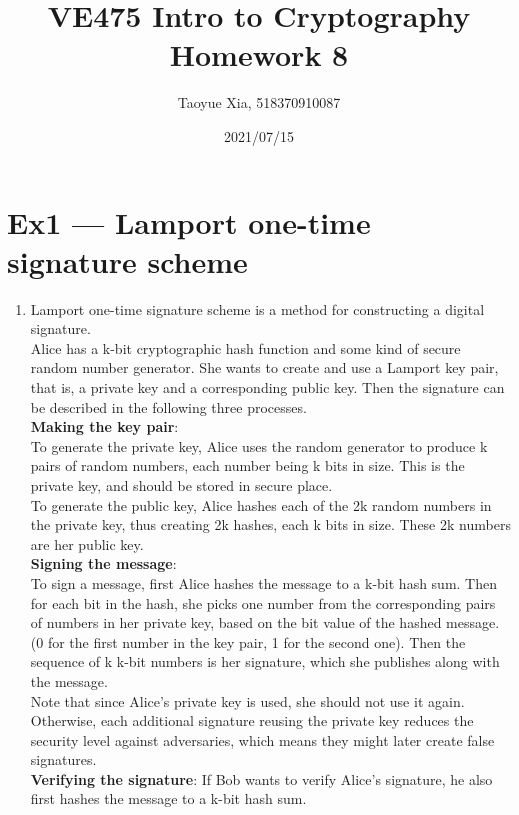 \documentclass[12pt, a4paper]{article}
\begin{document}
\title{VE475 Intro to Cryptography Homework 8}
\author{Taoyue Xia, 518370910087}
\date{2021/07/15}
\maketitle

\section*{Ex1 --- Lamport one-time signature scheme}
\begin{enumerate}
    \item Lamport one-time signature scheme is a method for constructing a digital signature.\\
          Alice has a k-bit cryptographic hash function and some kind of secure random number generator. 
          She wants to create and use a Lamport key pair, that is, a private key and a corresponding public key. 
          Then the signature can be described in the following three processes.\\
          \textbf{Making the key pair}:\\
          To generate the private key, Alice uses the random generator to produce k pairs of random numbers, 
          each number being k bits in size. This is the private key, and should be stored in secure place.\\
          To generate the public key, Alice hashes each of the 2k random numbers in the private key, 
          thus creating 2k hashes, each k bits in size. These 2k numbers are her public key.\\
          \textbf{Signing the message}:\\
          To sign a message, first Alice hashes the message to a k-bit hash sum. Then for each bit in the hash, 
          she picks one number from the corresponding pairs of numbers in her private key, 
          based on the bit value of the hashed message. (0 for the first number in the key pair, 1 for the second one). 
          Then the sequence of k k-bit numbers is her signature, which she publishes along with the message.\\
          Note that since Alice's private key is used, she should not use it again. Otherwise, 
          each additional signature reusing the private key reduces the security level against adversaries, 
          which means they might later create false signatures.\\
          \textbf{Verifying the signature}:
          If Bob wants to verify Alice's signature, he also first hashes the message to a k-bit hash sum. 

\end{enumerate}
\end{document}
